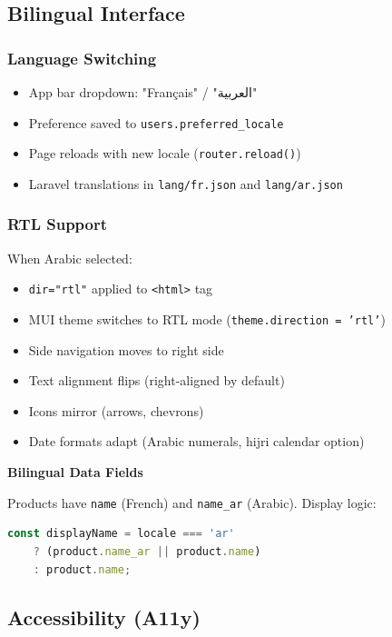 \subsection{Bilingual Interface}

\subsubsection{Language Switching}

\begin{itemize}
    \item App bar dropdown: "Français" / "العربية"
    \item Preference saved to \texttt{users.preferred\_locale}
    \item Page reloads with new locale (\texttt{router.reload()})
    \item Laravel translations in \texttt{lang/fr.json} and \texttt{lang/ar.json}
\end{itemize}

\subsubsection{RTL Support}

When Arabic selected:

\begin{itemize}
    \item \texttt{dir="rtl"} applied to \texttt{<html>} tag
    \item MUI theme switches to RTL mode (\texttt{theme.direction = 'rtl'})
    \item Side navigation moves to right side
    \item Text alignment flips (right-aligned by default)
    \item Icons mirror (arrows, chevrons)
    \item Date formats adapt (Arabic numerals, hijri calendar option)
\end{itemize}

\textbf{Bilingual Data Fields}

Products have \texttt{name} (French) and \texttt{name\_ar} (Arabic). Display logic:

\begin{lstlisting}[language=JavaScript,label=lst:bilingual-display]
const displayName = locale === 'ar' 
    ? (product.name_ar || product.name) 
    : product.name;
\end{lstlisting}

\subsection{Accessibility (A11y)}

